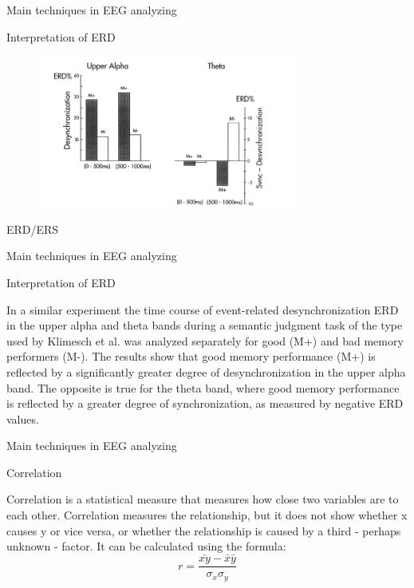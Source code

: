 \documentclass{beamer}
\begin{document}

\begin{frame}
{\centerline{Main techniques in EEG analyzing}}
{\centerline{Interpretation of ERD}}

\begin{figure}
    \centering
    \includegraphics[height=5cm]{P2023.AIBCCSS.BrainSignals/ERD ERS.png}
\end{figure}
    \begin{center}
        ERD/ERS
    \end{center}
\end{frame}

\begin{frame}
{\centerline{Main techniques in EEG analyzing}}
{\centerline{Interpretation of ERD}}
    In a similar experiment the time course of event-related desynchronization ERD in the upper alpha and theta bands during a semantic judgment task of the type used by Klimesch et al. was analyzed separately for good (M+) and bad memory performers (M-). The results show that good memory performance (M+) is reflected by a significantly greater degree of desynchronization in the upper alpha band. The opposite is true for the theta band, where good memory performance is reflected by a greater degree of synchronization, as measured by negative ERD values.
\end{frame}


\begin{frame}
{\centerline{Main techniques in EEG analyzing}}
{\centerline{Correlation}}
Correlation is a statistical measure that measures how close two variables are to each other. Correlation measures the relationship, but it does not show whether x causes y or vice versa, or whether the relationship is caused by a third - perhaps unknown - factor. It can be calculated using the formula:
\begin{equation}
    r=\frac{\bar{xy}-\bar{x}\bar{y}}{\sigma_{x}\sigma_{y}}
\end{equation}
\end{frame}
\end{document}
